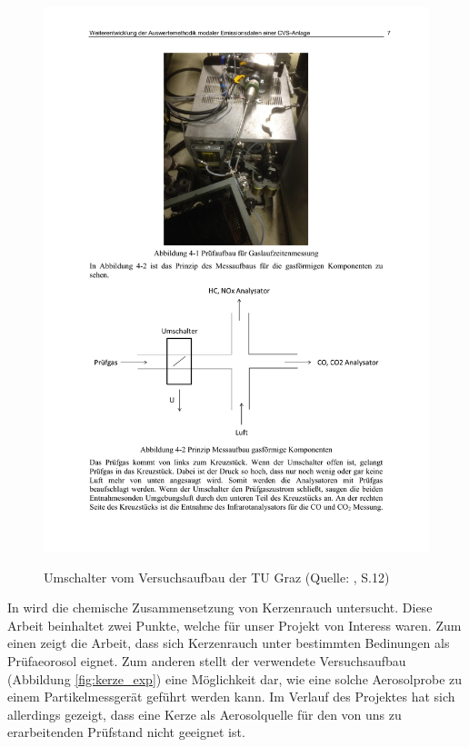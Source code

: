 \begin{figure}[H]
	\myfloatalign
	{\includegraphics[width=.9\linewidth]{gfx/related/graz_ventil.pdf}} \quad
	\caption[Umschalter vom Versuchsaufbau der TU Graz (Quelle: \cite{tu_graz}, S.12)]
	{Umschalter vom Versuchsaufbau der TU Graz (Quelle: \cite{tu_graz}, S.12)}
	\label{fig:umschalter_graz}
\end{figure}

In \cite{kerze} wird die chemische Zusammensetzung von Kerzenrauch untersucht. Diese Arbeit beinhaltet zwei Punkte, welche f\"{u}r unser Projekt von Interess waren. Zum einen zeigt die Arbeit, dass sich Kerzenrauch unter bestimmten Bedinungen als Pr\"{u}faeorosol eignet. Zum anderen stellt der verwendete Versuchsaufbau (Abbildung \ref{fig:kerze_exp}) eine M\"{o}glichkeit dar, wie eine solche Aerosolprobe zu einem Partikelmessger\"{a}t gef\"{u}hrt werden kann. Im Verlauf des Projektes hat sich allerdings gezeigt, dass eine Kerze als Aerosolquelle f\"{u}r den von uns zu erarbeitenden Pr\"{u}fstand nicht geeignet ist.

